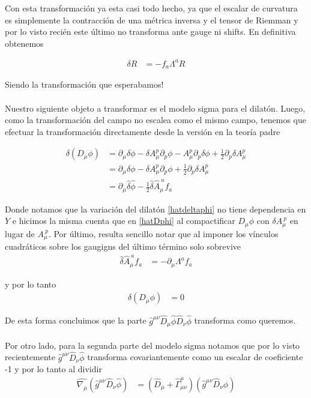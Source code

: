 \documentclass{article}
\numberwithin{equation}{section}
\begin{document}
Con esta transformación ya esta casi todo hecho, ya que el escalar
de curvatura es simplemente la contracción de una métrica inversa
y el tensor de Riemman y por lo visto recién este último no transforma
ante gauge ni shifts. En definitiva obtenemos

\begin{boxeq}
	
	\begin{align*}
	\delta R & =-f_{a}\Lambda^{a}R
	\end{align*}
	
	
\end{boxeq}

Siendo la transformación que esperabamos!\\
\\
Nuestro siguiente objeto a transformar es el modelo sigma para el
dilatón. Luego, como la transformación del campo no escalea como el
mismo campo, tenemos que efectuar la transformación directamente desde
la versión en la teoría padre

\begin{align*}
\delta\left(D_{\mu}\phi\right) & =\partial_{\mu}\delta\phi-\delta A_{\mu}^{p}\partial_{p}\phi-A_{\mu}^{p}\partial_{p}\delta\phi+\frac{1}{2}\partial_{p}\delta A_{\mu}^{p}\\
& =\partial_{\mu}\delta\phi-\delta A_{\mu}^{p}\partial_{p}\phi+\frac{1}{2}\partial_{p}\delta A_{\mu}^{p}\\
& =\partial_{\mu}\hat{\delta}\hat{\phi}-\frac{1}{2}\hat{\delta}\hat{A}_{\mu}^{\ a}f_{a}
\end{align*}


Donde notamos que la variación del dilatón \ref{hatdeltaphi} no tiene dependencia en
$Y$ e hicimos la misma cuenta que en \ref{hatDphi} al compactificar $D_{\mu}\phi$
con $\delta A_{\mu}^{\ p}$ en lugar de $A_{\mu}^{\ p}$. Por último,
resulta sencillo notar que al imponer los vínculos cuadráticos sobre
los gaugigns del último término solo sobrevive
\begin{align*}
\hat{\delta}\hat{A}_{\mu}^{\ a}f_{a} & =-\partial_{\mu}\Lambda^{a}f_{a}
\end{align*}


y por lo tanto
\begin{align*}
\delta\left(D_{\mu}\phi\right) & =0
\end{align*}


De esta forma concluimos que la parte $\hat{g}^{\mu\nu}\hat{D}_{\mu}\hat{\phi}\hat{D}_{\nu}\hat{\phi}$
transforma como queremos.\\
\\
Por otro lado, para la segunda parte del modelo sigma notamos que
por lo visto recientemente $\hat{g}^{\mu\nu}\hat{D}_{\nu}\hat{\phi}$
transforma covariantemente como un escalar de coeficiente -1 y por
lo tanto al dividir 
\begin{align*}
\hat{\nabla_{\mu}}\left(\hat{g}^{\mu\nu}\hat{D}_{\nu}\hat{\phi}\right) & =\left(\hat{D}_{\mu}+\hat{\Gamma}_{\mu\nu}^{\mu}\right)\left(\hat{g}^{\mu\nu}\hat{D}_{\nu}\hat{\phi}\right)
\end{align*}
\end{document}
